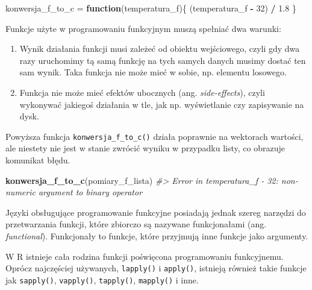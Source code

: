 \documentclass[paper=6in:9in,pagesize=pdftex,headinclude=on,footinclude=on,10pt]{scrbook}
\newenvironment{Shaded}{\begin{snugshade}}{\end{snugshade}}
\newcommand{\CommentTok}[1]{\textcolor[rgb]{0.56,0.35,0.01}{\textit{#1}}}
\newcommand{\ControlFlowTok}[1]{\textcolor[rgb]{0.13,0.29,0.53}{\textbf{#1}}}
\newcommand{\DecValTok}[1]{\textcolor[rgb]{0.00,0.00,0.81}{#1}}
\newcommand{\FloatTok}[1]{\textcolor[rgb]{0.00,0.00,0.81}{#1}}
\newcommand{\KeywordTok}[1]{\textcolor[rgb]{0.13,0.29,0.53}{\textbf{#1}}}
\newcommand{\NormalTok}[1]{#1}
\newcommand{\OperatorTok}[1]{\textcolor[rgb]{0.81,0.36,0.00}{\textbf{#1}}}
\newcommand{\StringTok}[1]{\textcolor[rgb]{0.31,0.60,0.02}{#1}}
\providecommand{\tightlist}{%
  \setlength{\itemsep}{0pt}\setlength{\parskip}{0pt}}
\let\BeginKnitrBlock\begin \let\EndKnitrBlock\end
\begin{document}
\begin{Shaded}
\begin{Highlighting}[]
\NormalTok{konwersja_f_to_c =}\StringTok{ }\ControlFlowTok{function}\NormalTok{(temperatura_f)\{}
\NormalTok{    (temperatura_f }\OperatorTok{-}\StringTok{ }\DecValTok{32}\NormalTok{) }\OperatorTok{/}\StringTok{ }\FloatTok{1.8}
\NormalTok{\}}
\end{Highlighting}
\end{Shaded}

\BeginKnitrBlock{rmdinfo}
Funkcje użyte w programowaniu funkcyjnym muszą spełniać dwa warunki:

\begin{enumerate}
\def\labelenumi{\arabic{enumi}.}
\tightlist
\item
  Wynik działania funkcji musi zależeć od obiektu wejściowego, czyli gdy dwa razy uruchomimy tą samą funkcję na tych samych danych musimy dostać ten sam wynik.
  Taka funkcja nie może mieć w sobie, np. elementu losowego.
\item
  Funkcja nie może mieć efektów ubocznych (ang. \emph{side-effects}), czyli wykonywać jakiegoś działania w tle, jak np. wyświetlanie czy zapisywanie na dysk.
\end{enumerate}
\EndKnitrBlock{rmdinfo}

Powyższa funkcja \texttt{konwersja\_f\_to\_c()} działa poprawnie na wektorach wartości, ale niestety nie jest w stanie zwrócić wyniku w przypadku listy, co obrazuje komunikat błędu.

\begin{Shaded}
\begin{Highlighting}[]
\KeywordTok{konwersja_f_to_c}\NormalTok{(pomiary_f_lista)}
\CommentTok{#> Error in temperatura_f - 32: non-numeric argument to binary operator}
\end{Highlighting}
\end{Shaded}

Języki obsługujące programowanie funkcyjne posiadają jednak szereg narzędzi do przetwarzania funkcji, które zbiorczo są nazywane funkcjonałami (ang. \emph{functional}).
Funkcjonały to funkcje, które przyjmują inne funkcje jako argumenty.

\BeginKnitrBlock{rmdinfo}
W R istnieje cała rodzina funkcji poświęcona programowaniu funkcyjnemu.
Oprócz najczęściej używanych, \texttt{lapply()} i \texttt{apply()}, istnieją również takie funkcje jak \texttt{sapply()}, \texttt{vapply()}, \texttt{tapply()}, \texttt{mapply()} i inne.
\EndKnitrBlock{rmdinfo}
\end{document}

